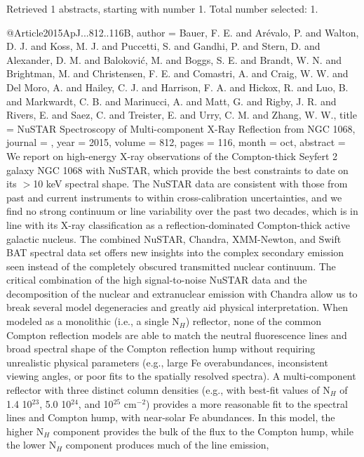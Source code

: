 \documentclass[longauth]{aa}
\begin{document}
{{{{{{{{{{Retrieved 1 abstracts, starting with number 1.  Total number selected: 1.

@Article{2015ApJ...812..116B,
  author        = {Bauer, F. E. and Ar{\'e}valo, P. and Walton, D. J. and Koss, M. J. and Puccetti, S. and Gandhi, P. and Stern, D. and Alexander, D. M. and Balokovi{\'c}, M. and Boggs, S. E. and Brandt, W. N. and Brightman, M. and Christensen, F. E. and Comastri, A. and Craig, W. W. and Del Moro, A. and Hailey, C. J. and Harrison, F. A. and Hickox, R. and Luo, B. and Markwardt, C. B. and Marinucci, A. and Matt, G. and Rigby, J. R. and Rivers, E. and Saez, C. and Treister, E. and Urry, C. M. and Zhang, W. W.},
  title         = {NuSTAR Spectroscopy of Multi-component X-Ray Reflection from NGC 1068},
  journal       = {\apj},
  year          = {2015},
  volume        = {812},
  pages         = {116},
  month         = oct,
  abstract      = {We report on high-energy X-ray observations of the Compton-thick Seyfert
2 galaxy NGC 1068 with NuSTAR, which provide the best constraints to
date on its $\gt$10 keV spectral shape. The NuSTAR data are consistent
with those from past and current instruments to within cross-calibration
uncertainties, and we find no strong continuum or line variability over
the past two decades, which is in line with its X-ray classification as
a reflection-dominated Compton-thick active galactic nucleus. The
combined NuSTAR, Chandra, XMM-Newton, and Swift BAT spectral data set
offers new insights into the complex secondary emission seen instead of
the completely obscured transmitted nuclear continuum. The critical
combination of the high signal-to-noise NuSTAR data and the
decomposition of the nuclear and extranuclear emission with Chandra
allow us to break several model degeneracies and greatly aid physical
interpretation. When modeled as a monolithic (i.e., a single
N$_{H}$) reflector, none of the common Compton reflection models
are able to match the neutral fluorescence lines and broad spectral
shape of the Compton reflection hump without requiring unrealistic
physical parameters (e.g., large Fe overabundances, inconsistent viewing
angles, or poor fits to the spatially resolved spectra). A
multi-component reflector with three distinct column densities (e.g.,
with best-fit values of N$_{H}$ of 1.4 {\times} 10$^{23}$,
5.0 {\times} 10$^{24}$, and 10$^{25}$ cm$^{-2}$)
provides a more reasonable fit to the spectral lines and Compton hump,
with near-solar Fe abundances. In this model, the higher N$_{H}$
component provides the bulk of the flux to the Compton hump, while the
lower N$_{H}$ component produces much of the line emission,
}}}}}}}}}}}}
\end{document}
